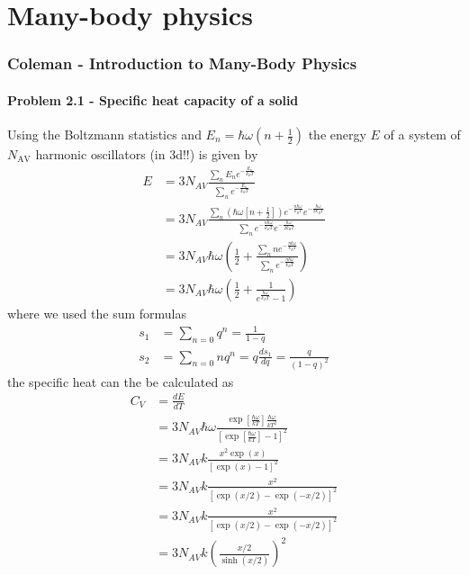 \documentclass[10pt,a4paper]{book}
\theoremstyle{definition}
\begin{document}
\chapter{Many-body physics}
\subsection{{\sc Coleman} - Introduction to Many-Body Physics}
\subsubsection{Problem 2.1 - Specific heat capacity of a solid}
Using the Boltzmann statistics and $E_n=\hbar\omega(n+\frac{1}{2})$ the energy $E$ of a system of $N_\text{AV}$ harmonic oscillators (in 3d!!) is given by 
\begin{align}
    E
    &=3N_{AV}\frac{\sum_nE_ne^{-\frac{E_n}{k_BT}}}{\sum_ne^{-\frac{E_n}{k_{B}T}}}\\
    &=3N_{AV}\frac{\sum_n\left(\hbar\omega\left[n+\frac{1}{2}\right]\right)e^{-\frac{n\hbar\omega}{k_BT}}e^{-\frac{\hbar\omega}{2k_BT}}}{\sum_ne^{-\frac{n\hbar\omega}{k_BT}}e^{-\frac{\hbar\omega}{2k_BT}}}\\
    &=3N_{AV}\hbar\omega\left(\frac{1}{2}+\frac{\sum_n ne^{-\frac{n\hbar\omega}{k_BT}}}{\sum_ne^{-\frac{n\hbar\omega}{k_BT}}}\right)\\
    &=3N_{AV}\hbar\omega\left(\frac{1}{2}+\frac{1}{e^{\frac{\hbar\omega}{k_BT}}-1}\right)
\end{align}
where we used the sum formulas
\begin{align}
    s_1&=\sum_{n=0}q^n=\frac{1}{1-q}\\
    s_2&=\sum_{n=0}nq^n=q\frac{ds_1}{dq}=\frac{q}{(1-q)^2}
\end{align}
the specific heat can the be calculated as
\begin{align}
    C_V&=\frac{dE}{dT}\\
    &=3N_{AV}\hbar\omega\frac{\exp\left[\frac{\hbar\omega}{kT}\right]\frac{\hbar\omega}{kT^2}}{\left[\exp\left[\frac{\hbar\omega}{kT}\right]-1\right]^2}\\
    &=3N_{AV}k\frac{x^2\exp(x)}{\left[\exp(x)-1\right]^2}\\
    &=3N_{AV}k\frac{x^2}{\left[\exp(x/2)-\exp(-x/2)\right]^2}\\
    &=3N_{AV}k\frac{x^2}{\left[\exp(x/2)-\exp(-x/2)\right]^2}\\
    &=3N_{AV}k\left(\frac{x/2}{\sinh(x/2)}\right)^2\\
\end{align}
\end{document}
